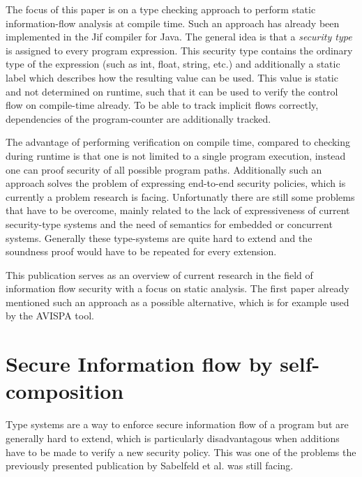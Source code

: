 \documentclass[a4paper,UKenglish]{lipics-v2018}
\begin{document}
The focus of this paper is on a type checking approach to perform static information-flow analysis at compile time. Such an approach has already been implemented in the Jif compiler for Java.\cite{JFlow} The general idea is that a \textit{security type} is assigned to every program expression. This security type contains the ordinary type of the expression (such as int, float, string, etc.) and additionally a static label which describes how the resulting value can be used. This value is static and not determined on runtime, such that it can be used to verify the control flow on compile-time already.\cite{language_based_information_flow_security}
To be able to track implicit flows correctly, dependencies of the program-counter are additionally tracked.

The advantage of performing verification on compile time, compared to checking during runtime is that one is not limited to a single program execution, instead one can proof security of all possible program paths.\cite{language_based_information_flow_security} Additionally such an approach solves the problem of expressing end-to-end security policies, which is currently a problem research is facing. Unfortunatly there are still some problems that have to be overcome, mainly related to the lack of expressiveness of current security-type systems and the need of semantics for embedded or concurrent systems. Generally these type-systems are quite hard to extend and the soundness proof would have to be repeated for every extension.\cite{language_based_information_flow_security}

This publication serves as an overview of current research in the field of information flow security with a focus on static analysis. The first paper already mentioned such an approach as a possible alternative, which is for example used by the AVISPA tool.\cite{model_checking_security_protocols} 






\section{Secure Information flow by self-composition}

Type systems are a way to enforce secure information flow of a program but are generally hard to extend, which is particularly disadvantagous when additions have to be made to verify a new security policy. This was one of the problems the previously presented publication by Sabelfeld et al. was still facing.
\cite{language_based_information_flow_security} 
\end{document}
